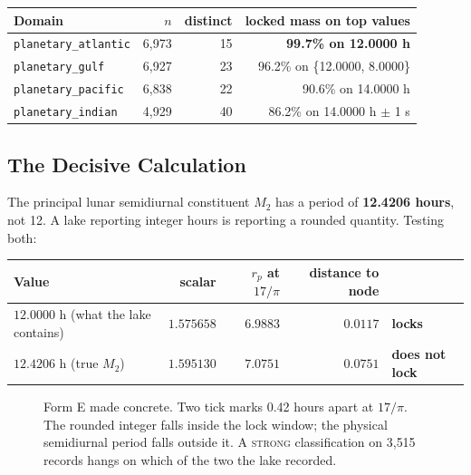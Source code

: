 \documentclass[11pt, letterpaper, openany]{book}
\begin{document}
\begin{table}[H]
\centering
\small
\begin{tabular}{@{}lrrr@{}}
\toprule
\textbf{Domain} & \textbf{$n$} & \textbf{distinct} & \textbf{locked mass on top values} \\
\midrule
\texttt{planetary\_atlantic} & 6{,}973 & 15 & \textbf{99.7\% on 12.0000 h} \\
\texttt{planetary\_gulf} & 6{,}927 & 23 & 96.2\% on \{12.0000, 8.0000\} \\
\texttt{planetary\_pacific} & 6{,}838 & 22 & 90.6\% on 14.0000 h \\
\texttt{planetary\_indian} & 4{,}929 & 40 & 86.2\% on 14.0000 h $\pm$ 1 s \\
\bottomrule
\end{tabular}
\end{table}

\subsection{The Decisive Calculation}

The principal lunar semidiurnal constituent $M_2$ has a period of \textbf{12.4206 hours}, not
12. A lake reporting integer hours is reporting a rounded quantity. Testing both:

\begin{table}[H]
\centering
\small
\begin{tabular}{@{}lrrrl@{}}
\toprule
\textbf{Value} & \textbf{scalar} & \textbf{$r_p$ at $17/\pi$} & \textbf{distance to node} & \\
\midrule
$12.0000$ h (what the lake contains) & $1.575658$ & $6.9883$ & $0.0117$ & \textbf{locks} \\
$12.4206$ h (true $M_2$) & $1.595130$ & $7.0751$ & $0.0751$ & \textbf{does not lock} \\
\bottomrule
\end{tabular}
\end{table}

\begin{figure}[H]
\centering
{}
\caption{Form E made concrete. Two tick marks 0.42 hours apart at $17/\pi$. The rounded integer
falls inside the lock window; the physical semidiurnal period falls outside it. A
\textsc{strong} classification on 3{,}515 records hangs on which of the two the lake recorded.}
\end{figure}
\end{document}
